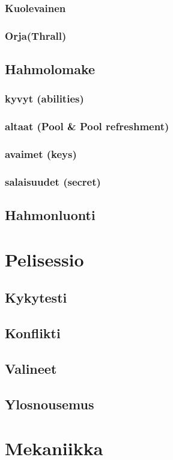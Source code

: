 \documentclass[a4paper, 12pt, finnish]{article}
\begin{document}
{		\subsubsection{Kuolevainen}
		\subsubsection{Orja(Thrall)}
	\subsection{Hahmolomake}
		\subsubsection{kyvyt (abilities)}
		\subsubsection{altaat (Pool \& Pool refreshment)}
		\subsubsection{avaimet (keys)}
		\subsubsection{salaisuudet (secret)}
	\subsection{Hahmonluonti}
\section{Pelisessio}
	\subsection{Kykytesti}
	\subsection{Konflikti}
	\subsection{Valineet}
	\subsection{Ylosnousemus}
\section{Mekaniikka}
}
\end{document}
